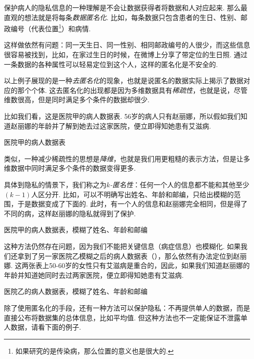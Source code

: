 保护病人的隐私信息的一种理解是不会让数据获得者将数据和人对应起来. 那么最直观的想法就是将每条\emph{数据匿名化}. 比如，每条数据只包含患者的生日、性别、邮政编号（代表位置\footnote{如果研究的是传染病，那么位置的意义也是很大的. }）和病情.

这样做依然有问题：同一天生日、同一性别、相同邮政编号的人很少，而这些信息很容易被找到，比如，在家过生日的时候，在微博上分享了带定位的生日照. 通过一条数据的各种属性可以轻易定位到这个人，这样的匿名化是不安全的.

以上例子展现的是一种\emph{去匿名化}的现象，也就是说匿名的数据实际上揭示了数据对应的那个个体. 这去匿名化的出现都是因为多维数据具有\emph{稀疏性}，也就是说，尽管维数很高，但是同时满足多个条件的数据却很少. 

比如我们看，这是医院甲的病人数据表. 56岁的病人只有赵丽娜，所以假如我们知道赵丽娜的年龄并了解到她去过这家医院，便立即得知她患有艾滋病.

\begin{table}[!ht]
\centering

\caption{医院甲的病人数据表}
\label{tab:tab01}
\end{table}

类似，一种减少稀疏性的思想是\emph{降维}，也就是我们用更粗糙的表示方法，但是让多维数据中同时满足多个条件的数据变得更多. 

具体到隐私的情景下，我们称之为\emph{$k$-匿名性}：任何一个人的信息都不能和其他至少$(k-1)$人区分开. 比如，可以不明确写出姓名、年龄和邮编，只给出模糊的范围，于是数据变成了下面的. 此时，有一个人的信息和赵丽娜完全相同，但是得了不同的病，这样赵丽娜的隐私就得到了保护.

\begin{table}[!ht]
\centering

\caption{医院甲的病人数据表，模糊了姓名、年龄和邮编}
\label{tab:tab02}
\end{table}

这种方法仍然存在问题，因为我们不能把关键信息（病症信息）也模糊化. 如果我们还拿到了另一家医院乙模糊之后的病人数据表（），那么依然有办法定位到赵丽娜. 这两张表上50-60岁的女性只有艾滋病是重合的，因此，如果我们知道赵丽娜的年龄并知道她同时去过两家医院，便立即得知她患有艾滋病.

\begin{table}[!ht]
\centering

\caption{医院乙的病人数据表，模糊了姓名、年龄和邮编}
\label{tab:tab03}
\end{table}

除了使用匿名化的手段，还有一种方法可以保护隐私：不再提供单人的数据，而是直接公布将数据集的总体信息，比如平均值. 但这种方法也不一定能保证不泄露单人数据，请看下面的例子. 

